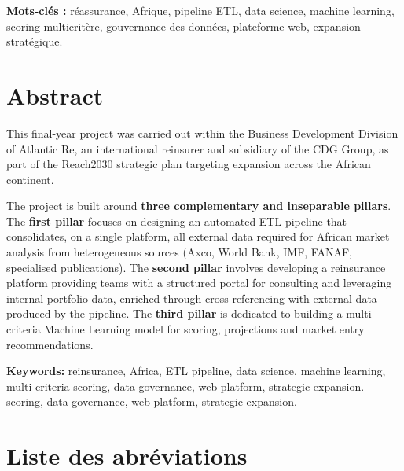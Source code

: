 \documentclass[12pt,a4paper]{report}
\begin{document}
\textbf{Mots-clés :} réassurance, Afrique, pipeline ETL, data science, machine learning,
scoring multicritère, gouvernance des données, plateforme web, expansion stratégique.


\clearpage

\chapter*{Abstract}

This final-year project was carried out within the Business Development Division of
Atlantic Re, an international reinsurer and subsidiary of the CDG Group, as part of
the Reach2030 strategic plan targeting expansion across the African continent.

The project is built around \textbf{three complementary and inseparable pillars}.
The \textbf{first pillar} focuses on designing an automated ETL pipeline that
consolidates, on a single platform, all external data required for African market
analysis from heterogeneous sources (Axco, World Bank, IMF, FANAF, specialised
publications). The \textbf{second pillar} involves developing a reinsurance platform
providing teams with a structured portal for consulting and leveraging internal
portfolio data, enriched through cross-referencing with external data produced by
the pipeline. The \textbf{third pillar} is dedicated to building a multi-criteria
Machine Learning model for scoring, projections and market entry recommendations.

\textbf{Keywords:} reinsurance, Africa, ETL pipeline, data science, machine learning,
multi-criteria scoring, data governance, web platform, strategic expansion.
scoring, data governance, web platform, strategic expansion.

\clearpage

\tableofcontents\clearpage
\listoffigures
{}
\clearpage
\listoftables
{}
\clearpage

\chapter*{Liste des abréviations}
\end{document}
